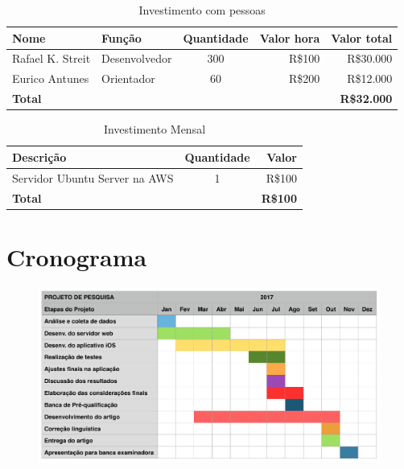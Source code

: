 \documentclass[
	12pt,
	oneside,
	a4paper,
	english,
	brazil,
]{abntex2}
\begin{document}
\noindent
\begin{table}[ht]
    \caption{Investimento com pessoas}

    \begin{tabularx}{\textwidth}{X|l|c|r|r}
    \hline
        \textbf{Nome} & 
        \textbf{Função} & 
        \textbf{Quantidade} & 
        \textbf{Valor hora} &
        \textbf{Valor total} \\
    \hline
        Rafael K. Streit&Desenvolvedor &300&R\$100&R\$30.000\\
        Eurico Antunes&Orientador&60&R\$200&R\$12.000 \\
    \hline
        \textbf{Total} &&&& \textbf{R\$32.000} \\
    \end{tabularx}
\end{table}

\noindent
\begin{table}[ht]
    \caption{Investimento Mensal}
    \begin{tabularx}{\textwidth}{X|c|r}
    \hline
        \textbf{Descrição} &
        \textbf{Quantidade} &
        \textbf{Valor} \\
    \hline
        Servidor Ubuntu Server na AWS &1 &R\$100 \\
    \hline
        \textbf{Total}&&\textbf{R\$100} \\ [1ex]
    \end{tabularx}
\end{table}



\chapter{Cronograma}

\begin{figure}[h]
\centering
\includegraphics[width=1.0\textwidth]{cronograma}
\end{figure}
\end{document}
